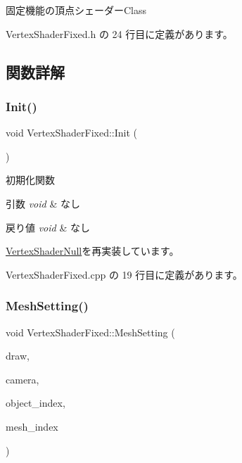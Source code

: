 固定機能の頂点シェーダー\+Class 

 Vertex\+Shader\+Fixed.\+h の 24 行目に定義があります。



\subsection{関数詳解}
\mbox{\label{class_vertex_shader_fixed_ae829ff736b33c45543804059255125b6}} 
\subsubsection{\texorpdfstring{Init()}{Init()}}
{\footnotesize\ttfamily void Vertex\+Shader\+Fixed\+::\+Init (\begin{DoxyParamCaption}{ }\end{DoxyParamCaption})\hspace{0.3cm}{\ttfamily [virtual]}}



初期化関数 


\begin{DoxyParams}{引数}
{\em void} & なし \\
\hline
\end{DoxyParams}

\begin{DoxyRetVals}{戻り値}
{\em void} & なし \\
\hline
\end{DoxyRetVals}


\mbox{\hyperlink{class_vertex_shader_null_a4d79b358dab49c840345d74823a16840}{Vertex\+Shader\+Null}}を再実装しています。



 Vertex\+Shader\+Fixed.\+cpp の 19 行目に定義があります。

\mbox{\label{class_vertex_shader_fixed_ab6e2024e01390866d778aa6db4085ac4}} 
\subsubsection{\texorpdfstring{Mesh\+Setting()}{MeshSetting()}}
{\footnotesize\ttfamily void Vertex\+Shader\+Fixed\+::\+Mesh\+Setting (\begin{DoxyParamCaption}\item[{\mbox{\hyperlink{class_draw_base}{Draw\+Base}} $\ast$}]{draw,  }\item[{\mbox{\hyperlink{class_camera}{Camera}} $\ast$}]{camera,  }\item[{unsigned}]{object\+\_\+index,  }\item[{unsigned}]{mesh\+\_\+index }\end{DoxyParamCaption})\hspace{0.3cm}{\ttfamily [virtual]}}



